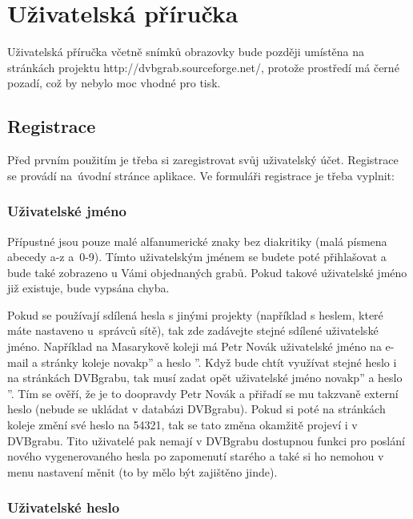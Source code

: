 \chapter{Uživatelská příručka}

Uživatelská příručka včetně snímků obrazovky bude později umístěna na stránkách projektu \linebreak[4]http://dvbgrab.sourceforge.net/, protože prostředí má černé pozadí, což by nebylo moc vhodné pro tisk.

\section{Registrace}

Před prvním použitím je třeba si zaregistrovat svůj uživatelský účet. Registrace se provádí na~úvodní stránce aplikace. Ve formuláři registrace je třeba vyplnit:

\subsection{Uživatelské jméno}

Přípustné jsou pouze malé alfanumerické znaky bez diakritiky (malá písmena abecedy a-z \linebreak[4]a~0-9). Tímto uživatelským jménem se budete poté přihlašovat a bude také zobrazeno u Vámi objednaných grabů. Pokud takové uživatelské jméno již existuje, bude vypsána chyba. 

Pokud se používají sdílená hesla s jinými projekty (například s heslem, které máte nastaveno u~správců sítě), tak zde zadávejte stejné sdílené uživatelské jméno. Například na Masarykově koleji má Petr Novák uživatelské jméno na e-mail a stránky koleje \quotedblbase novakp'' a heslo ''. Když bude chtít využívat stejné heslo i na stránkách DVBgrabu, tak musí zadat opět uživatelské jméno \quotedblbase novakp'' a heslo ''. Tím se ověří, že je to doopravdy Petr Novák a přiřadí se mu takzvaně externí heslo (nebude se ukládat v databázi DVBgrabu). Pokud si poté na stránkách koleje změní své heslo na 54321, tak se tato změna okamžitě projeví i v DVBgrabu. Tito uživatelé pak nemají v DVBgrabu dostupnou funkci pro poslání nového vygenerovaného hesla po zapomenutí starého a také si ho nemohou v menu nastavení měnit (to by mělo být zajištěno jinde).

\subsection{Uživatelské heslo}


